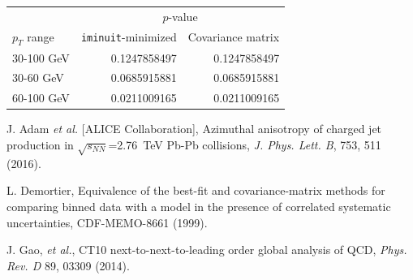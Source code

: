 \documentclass[11pt]{article}
\begin{document}
\begin{center}
\begin{tabular}{ l r r }
  & \multicolumn{2}{c}{$p$-value} \\
$p_T$ range & \texttt{iminuit}-minimized & Covariance matrix \\
\hline
30-100 GeV & 0.1247858497 & 0.1247858497 \\ 
30-60 GeV & 0.0685915881 & 0.0685915881 \\ 
60-100 GeV & 0.0211009165 & 0.0211009165 \\
\end{tabular}
\end{center}


\begin{thebibliography}{10}

 J. Adam {\it et al.} [ALICE Collaboration], Azimuthal anisotropy of charged jet production in $\sqrt{s_{NN}}$=2.76~TeV Pb-Pb collisions, {\it J. Phys. Lett. B}, 753, 511 (2016).

 L. Demortier, Equivalence of the best-fit and covariance-matrix methods for comparing binned data with a model in the presence of correlated systematic uncertainties, CDF-MEMO-8661 (1999).

 J. Gao, {\it et al.}, CT10 next-to-next-to-leading order global analysis of QCD, {\it Phys. Rev. D} 89, 03309 (2014).

\end{thebibliography}
\end{document}
